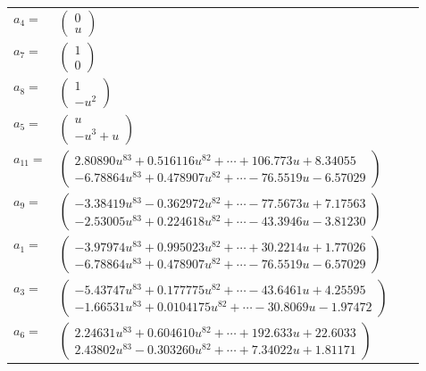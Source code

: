 \documentclass[1p]{elsarticle_modified}
\theoremstyle{definition}
\begin{document}
\begin{tabular}{m{7pt} m{180pt} m{7pt} m{180pt} }
\flushright $a_{4}=$&$\begin{pmatrix}0\\u\end{pmatrix}$ \\
\flushright $a_{7}=$&$\begin{pmatrix}1\\0\end{pmatrix}$ \\
\flushright $a_{8}=$&$\begin{pmatrix}1\\- u^2\end{pmatrix}$ \\
\flushright $a_{5}=$&$\begin{pmatrix}u\\- u^3+u\end{pmatrix}$ \\
\flushright $a_{11}=$&$\begin{pmatrix}2.80890 u^{83}+0.516116 u^{82}+\cdots+106.773 u+8.34055\\-6.78864 u^{83}+0.478907 u^{82}+\cdots-76.5519 u-6.57029\end{pmatrix}$ \\
\flushright $a_{9}=$&$\begin{pmatrix}-3.38419 u^{83}-0.362972 u^{82}+\cdots-77.5673 u+7.17563\\-2.53005 u^{83}+0.224618 u^{82}+\cdots-43.3946 u-3.81230\end{pmatrix}$ \\
\flushright $a_{1}=$&$\begin{pmatrix}-3.97974 u^{83}+0.995023 u^{82}+\cdots+30.2214 u+1.77026\\-6.78864 u^{83}+0.478907 u^{82}+\cdots-76.5519 u-6.57029\end{pmatrix}$ \\
\flushright $a_{3}=$&$\begin{pmatrix}-5.43747 u^{83}+0.177775 u^{82}+\cdots-43.6461 u+4.25595\\-1.66531 u^{83}+0.0104175 u^{82}+\cdots-30.8069 u-1.97472\end{pmatrix}$ \\
\flushright $a_{6}=$&$\begin{pmatrix}2.24631 u^{83}+0.604610 u^{82}+\cdots+192.633 u+22.6033\\2.43802 u^{83}-0.303260 u^{82}+\cdots+7.34022 u+1.81171\end{pmatrix}$ \\

\end{tabular}
\end{document}
